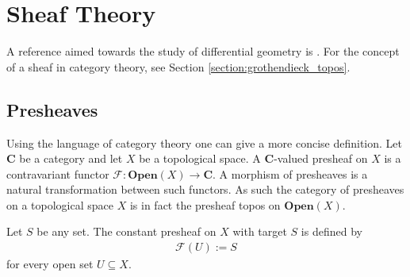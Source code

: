 \chapter{Sheaf Theory}\label{chapter:sheaf}

    A reference aimed towards the study of differential geometry is \cite{brylinski}. For the concept of a sheaf in category theory, see Section \ref{section:grothendieck_topos}.

\section{Presheaves}

    \begin{adefinition}
        Using the language of category theory one can give a more concise definition. Let $\mathbf{C}$ be a category and let $X$ be a topological space. A $\mathbf{C}$-valued presheaf on $X$ is a contravariant functor $\mathcal{F}:\mathbf{Open}(X)\rightarrow\mathbf{C}$. A morphism of presheaves is a natural transformation between such functors. As such the category of presheaves on a topological space $X$ is in fact the presheaf topos on $\mathbf{Open}(X)$.
    \end{adefinition}

    \begin{example}\label{sheaf:constant_presheaf}
        Let $S$ be any set. The constant presheaf on $X$ with target $S$ is defined by
        \begin{gather}
            \mathcal{F}(U) := S
        \end{gather}
        for every open set $U\subseteq X$.
    \end{example}

